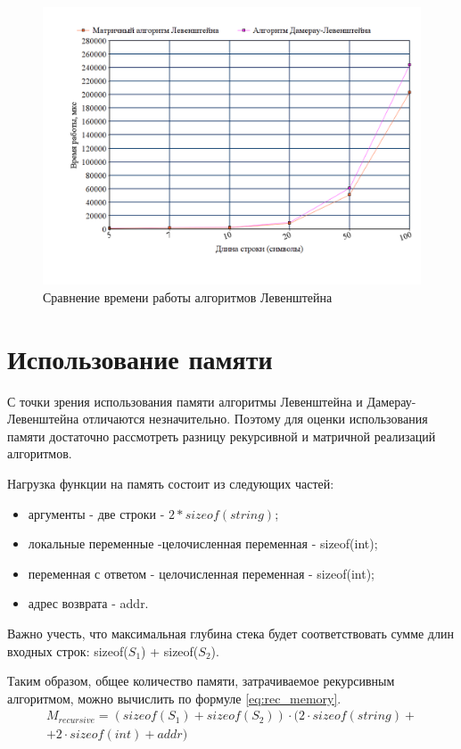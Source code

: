 \documentclass[a4paper,oneside,14pt]{extreport}
\begin{document}
\begin{figure}[H]
	\centering
	\includegraphics[width=1\linewidth]{images/dam_lev_graph}
	\caption{Сравнение времени работы алгоритмов Левенштейна}
	\label{fig:dam_lev_graph}
\end{figure} 

\section{Использование памяти}

С точки зрения использования памяти алгоритмы Левенштейна и Дамерау-Левенштейна отличаются незначительно. Поэтому для оценки использования памяти достаточно рассмотреть разницу рекурсивной и матричной реализаций алгоритмов.

Нагрузка функции на память состоит из следующих частей:
\begin{itemize}
\item аргументы - две строки - $2 * sizeof(string)$;
\item локальные переменные -целочисленная переменная - sizeof(int);
\item переменная с ответом - целочисленная переменная - sizeof(int);
\item адрес возврата - addr.

\end{itemize}

Важно учесть, что максимальная глубина стека будет соответствовать сумме длин входных строк: sizeof($S_{1}$) + sizeof($S_{2}$). 

Таким образом, общее количество памяти, затрачиваемое рекурсивным алгоритмом, можно вычислить по формуле \ref{eq:rec_memory}.
\begin{equation} \label{eq:rec_memory}
	\begin{array}{ll}
	M_{recursive} = (sizeof(S_{1}) + sizeof(S_{2})) \cdot (2 \cdot sizeof(string) +\\
	+ 2 \cdot sizeof(int) + addr)
	\end{array}
\end{equation} 
\end{document}
